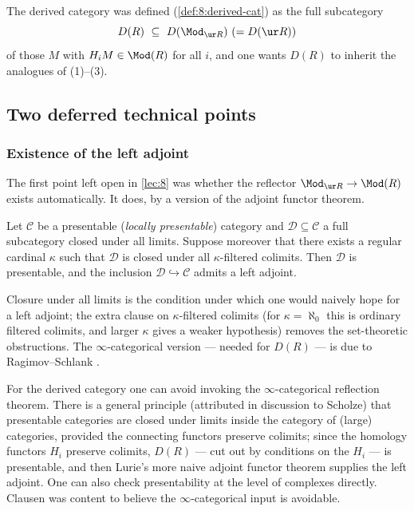 The derived category was defined (\cref{def:8:derived-cat}) as the full
subcategory
\begin{equation*}
D(R)\ \subseteq\ D(\Mod_{\ur R})\ (=D(\ur R))
\end{equation*}
of those $M$ with $H_{i}M\in\Mod(R)$ for all $i$, and one wants $D(R)$ to
inherit the analogues of (1)--(3).

\subsection{Two deferred technical points}

\subsubsection*{Existence of the left adjoint}

The first point left open in \cref{lec:8} was whether the reflector
$\Mod_{\ur R}\to\Mod(R)$ exists automatically. It does, by a version of the
adjoint functor theorem.

\begin{theorem}
\label{prop:9:reflection}
Let $\mathcal C$ be a presentable (\emph{locally presentable}) category and
$\mathcal D\subseteq\mathcal C$ a full subcategory closed under all limits.
Suppose moreover that there exists a regular cardinal $\kappa$ such that
$\mathcal D$ is closed under all $\kappa$-filtered colimits. Then $\mathcal D$
is presentable, and the inclusion $\mathcal D\hookrightarrow\mathcal C$ admits a
left adjoint.
\end{theorem}

Closure under all limits is the condition under which one would naively hope for
a left adjoint; the extra clause on $\kappa$-filtered colimits (for
$\kappa=\aleph_{0}$ this is ordinary filtered colimits, and larger $\kappa$
gives a weaker hypothesis) removes the set-theoretic obstructions. The
$\infty$-categorical version --- needed for $D(R)$ --- is due to
Ragimov--Schlank \cite{ragimov2026inftycategoricalreflectiontheoremapplications}.

\begin{remark}
\label{rmk:9:presentable-derived}
For the derived category one can avoid invoking the $\infty$-categorical
reflection theorem. There is a general principle (attributed in discussion to
Scholze) that presentable categories are closed under limits inside the
category of (large) categories, provided the connecting functors preserve
colimits; since the homology functors $H_{i}$ preserve colimits, $D(R)$ --- cut
out by conditions on the $H_{i}$ --- is presentable, and then Lurie's more
naive adjoint functor theorem \cite{lurie2017higher} supplies the left adjoint.
One can also check presentability at the level of complexes directly. Clausen
was content to believe the $\infty$-categorical input is avoidable.
\end{remark}

